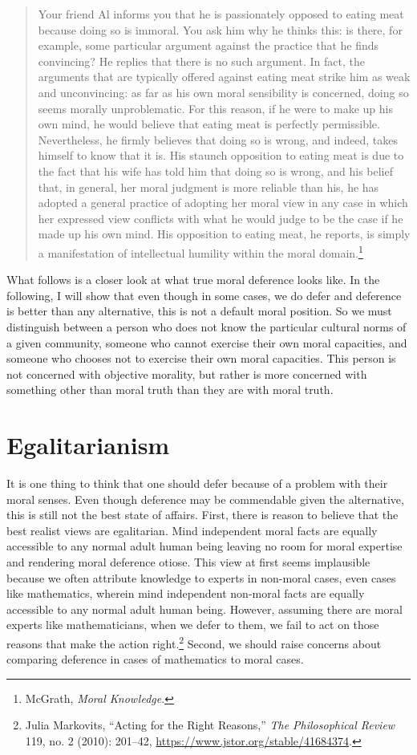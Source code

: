 \documentclass[phdthesis,12pt,final,a4paper]{wuthesis}
\theoremstyle{definition}
\theoremstyle{definition}
\theoremstyle{definition}
\theoremstyle{definition}
\theoremstyle{remark}
\begin{document}
\begin{quote}
Your friend Al informs you that he is passionately opposed to eating meat because doing so is immoral. You ask him why he thinks this: is there, for example, some particular argument against the practice that he finds convincing? He replies that there is no such argument. In fact, the arguments that are typically offered against eating meat strike him as weak and unconvincing: as far as his own moral sensibility is concerned, doing so seems morally unproblematic. For this reason, if he were to make up his own mind, he would believe that eating meat is perfectly permissible. Nevertheless, he firmly believes that doing so is wrong, and indeed, takes himself to know that it is. His staunch opposition to eating meat is due to the fact that his wife has told him that doing so is wrong, and his belief that, in general, her moral judgment is more reliable than his, he has adopted a general practice of adopting her moral view in any case in which her expressed view conflicts with what he would judge to be the case if he made up his own mind. His opposition to eating meat, he reports, is simply a manifestation of intellectual humility within the moral domain.\footnote{McGrath, \emph{Moral {Knowledge}}.}
\end{quote}

What follows is a closer look at what true moral deference looks like. In the following, I will show that even though in some cases, we do defer and deference is better than any alternative, this is not a default moral position. So we must distinguish between a person who does not know the particular cultural norms of a given community, someone who cannot exercise their own moral capacities, and someone who chooses not to exercise their own moral capacities. This person is not concerned with objective morality, but rather is more concerned with something other than moral truth than they are with moral truth.

\section{Egalitarianism}\label{egalitarianism}

It is one thing to think that one should defer because of a problem with their moral senses. Even though deference may be commendable given the alternative, this is still not the best state of affairs. First, there is reason to believe that the best realist views are egalitarian. Mind independent moral facts are equally accessible to any normal adult human being leaving no room for moral expertise and rendering moral deference otiose. This view at first seems implausible because we often attribute knowledge to experts in non-moral cases, even cases like mathematics, wherein mind independent non-moral facts are equally accessible to any normal adult human being. However, assuming there are moral experts like mathematicians, when we defer to them, we fail to act on those reasons that make the action right.\footnote{Julia Markovits, {``Acting for the {Right Reasons},''} \emph{The Philosophical Review} 119, no. 2 (2010): 201--42, \url{https://www.jstor.org/stable/41684374}.} Second, we should raise concerns about comparing deference in cases of mathematics to moral cases.
\end{document}
